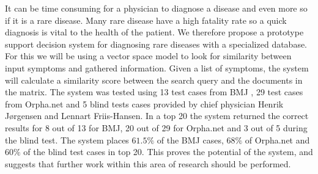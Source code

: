 It can be time consuming for a physician to diagnose a disease and
even more so if it is a rare disease. Many rare disease have a high
fatality rate so a quick diagnosis is vital to the health of the
patient. We therefore propose a prototype support decision system for
diagnosing rare diseases with a specialized database. For this we will
be using a vector space model to look for similarity between input
symptoms and gathered information. Given a list of symptoms, the
system will calculate a similarity score between the search query and
the documents in the matrix. The system was tested using 13 test cases
from BMJ \cite{HangwiTang11102006}, 29 test cases from Orpha.net and 5
blind tests cases provided by chief physician Henrik J\o rgensen and
Lennart Friis-Hansen. In a top 20 the system returned the correct
results for 8 out of 13 for BMJ, 20 out of 29 for Orpha.net and 3 out
of 5 during the blind test. The system places $61.5\%$ of the BMJ
cases, $68\%$ of Orpha.net and $60\%$ of the blind test cases in top
20. This proves the potential of the system, and suggests that further
work within this area of research should be performed.
